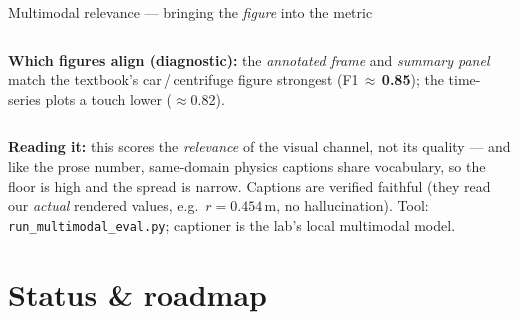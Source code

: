 \documentclass[aspectratio=169,10pt]{beamer}
\newcommand{\hl}[1]{{\bfseries\color{cAccent}#1}}
\begin{document}
\begin{frame}{Multimodal relevance --- bringing the \emph{figure} into the metric}
\begin{columns}[T]
{\scriptsize\textbf{Which figures align (diagnostic):} the \emph{annotated frame} and \emph{summary panel} match the textbook's car\,/\,centrifuge figure strongest (F1\,$\approx$\,\hl{0.85}); the time-series plots a touch lower ($\approx$0.82).}
\end{columns}
\vspace{0.4em}
{\scriptsize \textbf{Reading it:} this scores the \emph{relevance} of the visual channel, not its quality --- and like the prose number, same-domain physics captions share vocabulary, so the floor is high and the spread is narrow. Captions are verified faithful (they read our \emph{actual} rendered values, e.g.\ $r=0.454$\,m, no hallucination). Tool: \texttt{run\_multimodal\_eval.py}; captioner is the lab's local multimodal model.}
\end{frame}


\section{Status \& roadmap}
\end{document}
